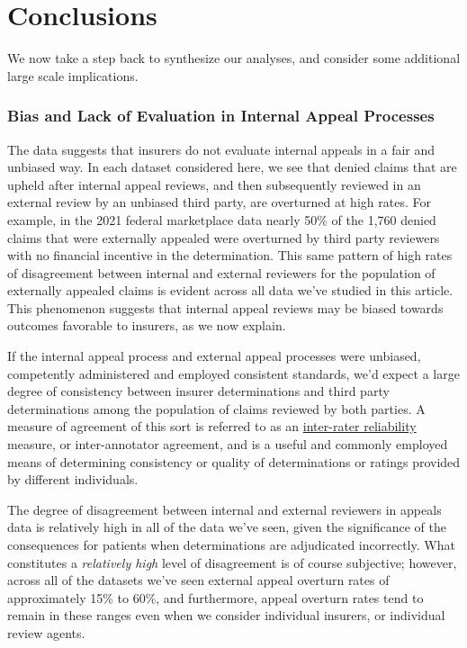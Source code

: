 \documentclass[12pt, a4paper,twoside]{report}
\theoremstyle{plain} %
\theoremstyle{definition} %
\theoremstyle{remark} %
\numberwithin{equation}{chapter}
\begin{document}
		\chapter{Conclusions}\label{conclusions}
		
		We now take a step back to synthesize our analyses, and consider some additional large scale implications.
		
		\subsection{Bias and Lack of Evaluation in Internal Appeal Processes}
		
		The data suggests that insurers do not evaluate internal appeals in a fair and unbiased way. In each dataset considered here, we see that denied claims that are upheld after internal appeal reviews, and then subsequently reviewed in an external review by an unbiased third party, are overturned at high rates. For example, in the 2021 federal marketplace data nearly 50\% of the 1,760 denied claims that were externally appealed were overturned by third party reviewers with no financial incentive in the determination. This same pattern of high rates of disagreement between internal and external reviewers for the population of externally appealed claims is evident across all data we've studied in this article. This phenomenon suggests that internal appeal reviews may be biased towards outcomes favorable to insurers, as we now explain.
		
		If the internal appeal process and external appeal processes were unbiased, competently administered and employed consistent standards, we'd expect a large degree of consistency between insurer determinations and third party determinations among the population of claims reviewed by both parties. A measure of agreement of this sort is referred to as an \href{https://en.wikipedia.org/wiki/Inter-rater_reliability}{inter-rater reliability} measure, or inter-annotator agreement, and is a useful and commonly employed means of determining consistency or quality of determinations or ratings provided by different individuals.
		
		The degree of disagreement between internal and external reviewers in appeals data is relatively high in all of the data we've seen, given the significance of the consequences for patients when determinations are adjudicated incorrectly. What constitutes a \emph{relatively high} level of disagreement is of course subjective; however, across all of the datasets we've seen external appeal overturn rates of approximately 15\% to 60\%, and furthermore, appeal overturn rates tend to remain in these ranges even when we consider individual insurers, or individual review agents.
		
\end{document}
